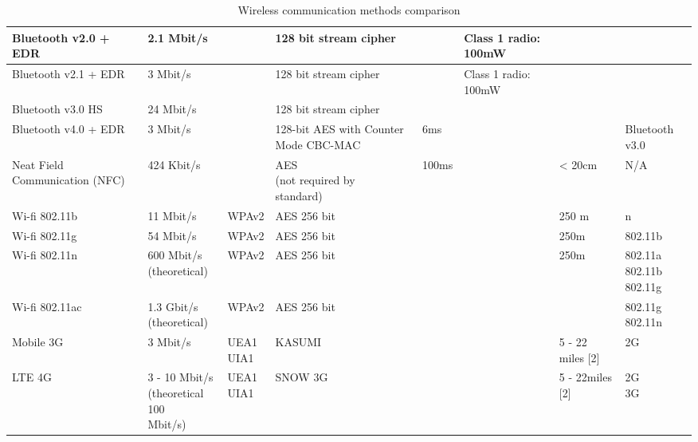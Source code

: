 \documentclass[a4paper]{report}
\begin{document}
\begin{landscape}
\begin{table}[h]
{\begin{minipage}{\textwidth}
\begin{tabular}{ | m{3cm} | m{3cm} | m{3.5cm} | m{3cm} | m{2.5cm} | m{2.5cm} | m{2.5cm} | m{2.5cm} |}
   Bluetooth v2.0 + EDR & 2.1 Mbit/s & & 128 bit stream cipher & & Class 1 radio: 100mW & &  \\ \hline
   Bluetooth v2.1 + EDR & 3 Mbit/s & & 128 bit stream cipher & & Class 1 radio: 100mW & & \\ \hline
   Bluetooth v3.0 HS & 24 Mbit/s & & 128 bit stream cipher & & & & \\ \hline
   Bluetooth v4.0 + EDR & 3 Mbit/s & & 128-bit AES with Counter Mode CBC-MAC & 6ms & & & Bluetooth v3.0 \\ \hline
   Neat Field Communication (NFC) & 424 Kbit/s & & \pbox{20cm}{AES \\(not required by \\standard)} & 100ms & & < 20cm & N/A \\ \hline
   Wi-fi 802.11b & 11 Mbit/s & WPAv2 & AES 256 bit & & & 250 m & n \\ \hline
   Wi-fi 802.11g & 54 Mbit/s & WPAv2 & AES 256 bit & & & 250m & 802.11b \\ \hline
   Wi-fi 802.11n & \pbox{20cm}{600 Mbit/s \\(theoretical)} & WPAv2 & AES 256 bit & & & 250m & \pbox{20cm}{802.11a  \\802.11b \\802.11g} \\ \hline
   Wi-fi 802.11ac &  \pbox{20cm}{1.3 Gbit/s \\(theoretical)} & WPAv2 & AES 256 bit & & & & \pbox{20cm}{802.11g \\802.11n} \\ \hline
   Mobile 3G & 3 Mbit/s & \pbox{20cm}{UEA1 \\UIA1} & KASUMI & & & 5 - 22 miles [2] & 2G \\ \hline
   LTE 4G & \pbox{20cm}{3 - 10 Mbit/s \\(theoretical 100 \\Mbit/s)} & \pbox{20cm}{UEA1 \\UIA1} & SNOW 3G & & & 5 - 22miles [2] & \pbox{20cm}{2G \\3G}  \\ \hline
   
    \end{tabular}


\caption[Table caption text]{Wireless communication methods comparison} 
\label{table:wireless_comp}
\end{minipage} }
\end{table}

\end{landscape}
\end{document}
